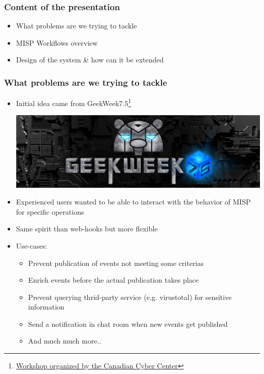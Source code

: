 
\begin{frame}[t,plain]
\titlepage
\end{frame}

\begin{frame}
    \frametitle{Content of the presentation}
    \begin{itemize}
        \item What problems are we trying to tackle
        \item MISP Workflows overview
        \item Design of the system \& how can it be extended
    \end{itemize}
\end{frame}

\begin{frame}
    \frametitle{What problems are we trying to tackle}
    \begin{itemize}
        \item Initial idea came from GeekWeek7.5\footnote{\href{https://cyber.gc.ca/en/events/geekweek-75}{Workshop organized by the Canadian Cyber Center}}
        \begin{center}
            \includegraphics[width=0.3\linewidth]{pictures/geekweek75.jpg}
        \end{center}
        \item Experienced users wanted to be able to interact with the behavior of MISP for specific operations
        \item Same spirit than web-hooks but more flexible
        \item Use-cases:
        \begin{itemize}
            \item Prevent publication of events not meeting some criterias
            \item Enrich events before the actual publication takes place
            \item Prevent querying thrid-party service (e.g. virustotal) for sensitive information
            \item Send a notification in chat room when new events get published
            \item And much much more..
        \end{itemize}
    \end{itemize}
\end{frame}

